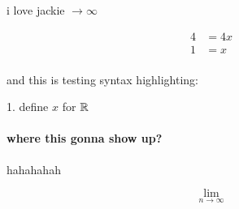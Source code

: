 \documentclass[a4paper]{article}
\begin{document}
	\begin{theorem}
	i love jackie  $\to \infty$
	\end{theorem}
	\begin{align}
		4 &= 4x \\
		1 &= x \\
	 \end{align}
	 \begin{text}
			and this is testing syntax highlighting:
	 \end{text}
	 \begin{text}
	 	1. define $x$ for $\mathbb{R}$
	 \end{text}
	 \paragraph{where this gonna show up?}
hahahahah

	\[
	\lim_{n \to \infty} 
	\] 
\end{document}
